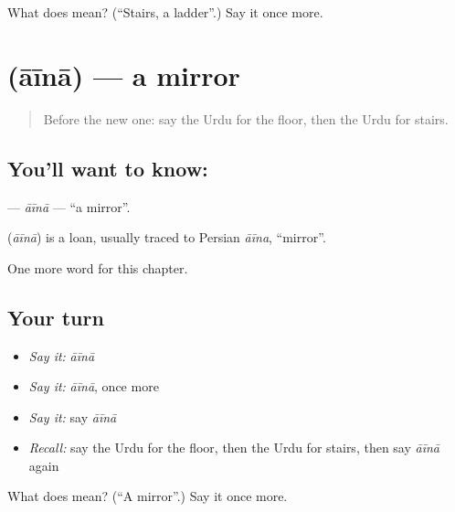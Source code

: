 \begin{tcolorbox}[breakable,colback=teal!4,colframe=teal!35!black,title={Before you move on}]
What does  mean? (\textquotedblleft{}Stairs, a ladder\textquotedblright{}.) Say it once more.
\end{tcolorbox}
\section[\texorpdfstring{\ur{آئینہ} (āīnā)}{آئینہ (āīnā)}]{ (āīnā) — a mirror}

\label{lesson:UR-C59-aina}



\begin{quote}
Before the new one: say the Urdu for the floor, then the Urdu for stairs.
\end{quote}

\subsection*{You'll want to know: }
\textbf{} — \emph{āīnā} — \textquotedblleft{}a mirror\textquotedblright{}.

\begin{cousinweb}
\textbf{} (\emph{āīnā}) is a loan, usually traced to Persian \emph{āīna}, \textquotedblleft{}mirror\textquotedblright{}.
\end{cousinweb}

\begin{grammarlens}[title={What you've built}]
One more word for this chapter.
\end{grammarlens}

\subsection*{Your turn}
\begin{itemize}
\raggedright
  \item \emph{Say it:} \emph{āīnā}
  \item \emph{Say it:} \emph{āīnā}, once more
  \item \emph{Say it:} say \emph{āīnā}
  \item \emph{Recall:} say the Urdu for the floor, then the Urdu for stairs, then say \emph{āīnā} again
\end{itemize}

\begin{tcolorbox}[breakable,colback=teal!4,colframe=teal!35!black,title={Before you move on}]
What does  mean? (\textquotedblleft{}A mirror\textquotedblright{}.) Say it once more.
\end{tcolorbox}
